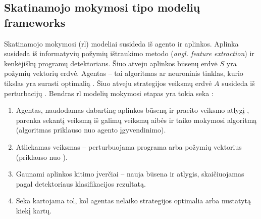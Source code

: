 \subsection{Skatinamojo mokymosi tipo modelių \glspl{framework}}\label{sec:literature:rl}

Skatinamojo mokymosi (\gls{rl}) modeliai susideda iš agento ir aplinkos.
Aplinka susideda iš informatyvių požymių ištraukimo metodo (\textit{angl.
    feature extraction}) ir kenkėjiškų programų detektoriaus. Šiuo atveju aplinkos
būsenų erdvė $S$ yra požymių vektorių erdvė. Agentas -- tai algoritmas ar
neuroninis tinklas, kurio tikslas yra surasti optimalią . Šiuo atveju strategijos veiksmų erdvė $A$ susideda iš
perturbacijų 
\cite{fangEvadingMalwareEngines2019}. Bendras \gls{rl} modelių mokymosi etapas
yra tokia seka \cite{fangEvadingMalwareEngines2019,
    zhongReinforcementLearningBased2022}:
\begin{enumerate}
    \item Agentas, naudodamas dabartinę aplinkos būseną ir praeito veiksmo atlygį
          , parenka sekantį veiksmą iš galimų veiksmų aibės ir taiko
          mokymosi algoritmą (algoritmas priklauso nuo agento įgyvendinimo).
    \item Atliekamas veiksmas -- perturbuojama programa arba požymių vektorius (priklauso
          nuo ).
    \item Gaunami aplinkos kitimo įverčiai -- nauja būsena ir atlygis, skaičiuojamas
          pagal detektoriaus klasifikacijos rezultatą.
    \item Seka kartojama tol, kol agentas nelaiko strategijos optimalia arba nustatytą
          kiekį kartų.
\end{enumerate}

